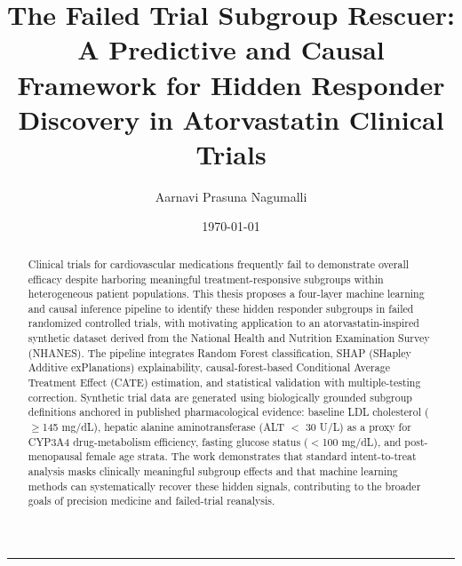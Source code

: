 \documentclass[12pt]{article}
\title{\textbf{The Failed Trial Subgroup Rescuer:}\\[4pt]
\large A Predictive and Causal Framework for Hidden Responder\\
Discovery in Atorvastatin Clinical Trials}
\author{Aarnavi Prasuna Nagumalli}
\date{\today}
\begin{document}
\maketitle

\begin{abstract}
Clinical trials for cardiovascular medications frequently fail to
demonstrate overall efficacy despite harboring meaningful treatment-responsive
subgroups within heterogeneous patient populations.  This thesis proposes a
four-layer machine learning and causal inference pipeline to identify these
hidden responder subgroups in failed randomized controlled trials, with
motivating application to an atorvastatin-inspired synthetic dataset derived
from the National Health and Nutrition Examination Survey (NHANES).  The
pipeline integrates Random Forest classification, SHAP (SHapley Additive
exPlanations) explainability, causal-forest-based Conditional Average
Treatment Effect (CATE) estimation, and statistical validation with
multiple-testing correction.  Synthetic trial data are generated using
biologically grounded subgroup definitions anchored in published
pharmacological evidence: baseline LDL cholesterol ($\geq$145 mg/dL),
hepatic alanine aminotransferase (ALT $<$ 30 U/L) as a proxy for CYP3A4
drug-metabolism efficiency, fasting glucose status ($<$100 mg/dL), and
post-menopausal female age strata.  The work demonstrates that standard
intent-to-treat analysis masks clinically meaningful subgroup effects and
that machine learning methods can systematically recover these hidden signals,
contributing to the broader goals of precision medicine and failed-trial
reanalysis.
\end{abstract}

\vspace{6pt}
\hrule
\vspace{6pt}
\end{document}
